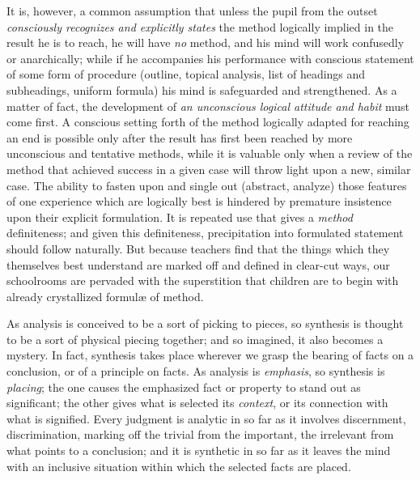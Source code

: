 \documentclass[letterpaper]{book}
\begin{document}

It is, however, a common assumption that unless the pupil from the
outset \emph{consciously recognizes and explicitly states} the method
logically implied in the result he is to reach, he will have \emph{no}
method, and his mind will work confusedly or anarchically; while if he
accompanies his performance with conscious statement of some form of
procedure (outline, topical analysis, list of headings and subheadings,
uniform formula) his mind is safeguarded and strengthened. As a matter
of fact, the development of \emph{an unconscious logical attitude and
habit} must come first. A conscious setting forth of the method
logically adapted for reaching an end is possible only after the result
has first been reached by more unconscious and tentative methods, while
it is valuable only when a review of the method that achieved success in
a given case will throw light upon a new, similar case. The ability to
fasten upon and single out (abstract, analyze) those features of one
experience which are logically best is hindered by premature insistence
upon their explicit formulation. It is repeated use that gives a
\emph{method} definiteness; and given this definiteness, precipitation
into formulated statement should follow naturally. But because teachers
find that the things which they themselves best understand are marked
off and defined in clear-cut ways, our schoolrooms are
pervaded
with the superstition that children are to begin with already
crystallized formulæ of method.


As analysis is conceived to be a sort of picking to pieces, so synthesis
is thought to be a sort of physical piecing together; and so imagined,
it also becomes a mystery. In fact, synthesis takes place wherever we
grasp the bearing of facts on a conclusion, or of a principle on facts.
As analysis is \emph{emphasis}, so synthesis is \emph{placing}; the one
causes the emphasized fact or property to stand out as significant; the
other gives what is selected its \emph{context}, or its connection with
what is signified. Every judgment is analytic in so far as it involves
discernment, discrimination, marking off the trivial from the important,
the irrelevant from what points to a conclusion; and it is synthetic in
so far as it leaves the mind with an inclusive situation within which
the selected facts are placed.

\end{document}
